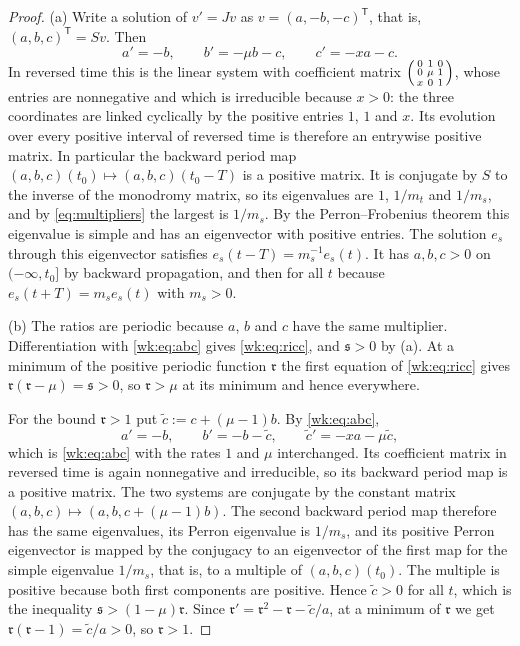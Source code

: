 \begin{proof}
(a) Write a solution of $v'=Jv$ as $v=(a,-b,-c)^{\mathsf T}$, that is, $(a,b,c)^{\mathsf T}=Sv$. Then
\begin{equation}\label{wk:eq:abc}
a'=-b,\qquad b'=-\mu b-c,\qquad c'=-xa-c .
\end{equation}
In reversed time this is the linear system with coefficient matrix
$\begin{psmallmatrix}0&1&0\\0&\mu&1\\x&0&1\end{psmallmatrix}$, whose entries are nonnegative and which is irreducible because $x>0$: the three coordinates are linked cyclically by the positive entries $1$, $1$ and $x$. Its evolution over every positive interval of reversed time is therefore an entrywise positive matrix. In particular the backward period map $(a,b,c)(t_0)\mapsto(a,b,c)(t_0-T)$ is a positive matrix. It is conjugate by $S$ to the inverse of the monodromy matrix, so its eigenvalues are $1$, $1/m_t$ and $1/m_s$, and by \eqref{eq:multipliers} the largest is $1/m_s$. By the Perron--Frobenius theorem this eigenvalue is simple and has an eigenvector with positive entries. The solution $e_s$ through this eigenvector satisfies $e_s(t-T)=m_s^{-1}e_s(t)$. It has $a,b,c>0$ on $(-\infty,t_0]$ by backward propagation, and then for all $t$ because $e_s(t+T)=m_se_s(t)$ with $m_s>0$.

(b) The ratios are periodic because $a$, $b$ and $c$ have the same multiplier. Differentiation with \eqref{wk:eq:abc} gives \eqref{wk:eq:ricc}, and $\mathfrak s>0$ by (a). At a minimum of the positive periodic function $\mathfrak r$ the first equation of \eqref{wk:eq:ricc} gives $\mathfrak r(\mathfrak r-\mu)=\mathfrak s>0$, so $\mathfrak r>\mu$ at its minimum and hence everywhere.

For the bound $\mathfrak r>1$ put $\tilde c:=c+(\mu-1)b$. By \eqref{wk:eq:abc},
\[
a'=-b,\qquad b'=-b-\tilde c,\qquad \tilde c'=-xa-\mu\tilde c ,
\]
which is \eqref{wk:eq:abc} with the rates $1$ and $\mu$ interchanged. Its coefficient matrix in reversed time is again nonnegative and irreducible, so its backward period map is a positive matrix. The two systems are conjugate by the constant matrix $(a,b,c)\mapsto(a,b,c+(\mu-1)b)$. The second backward period map therefore has the same eigenvalues, its Perron eigenvalue is $1/m_s$, and its positive Perron eigenvector is mapped by the conjugacy to an eigenvector of the first map for the simple eigenvalue $1/m_s$, that is, to a multiple of $(a,b,c)(t_0)$. The multiple is positive because both first components are positive. Hence $\tilde c>0$ for all $t$, which is the inequality $\mathfrak s>(1-\mu)\mathfrak r$. Since $\mathfrak r'=\mathfrak r^2-\mathfrak r-\tilde c/a$, at a minimum of $\mathfrak r$ we get $\mathfrak r(\mathfrak r-1)=\tilde c/a>0$, so $\mathfrak r>1$.


\end{proof}
